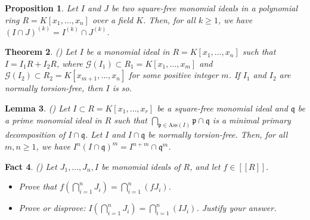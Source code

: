 \documentclass[11pt]{amsart}
\newtheorem{theorem}{Theorem}[section]
\newtheorem{fact}[theorem]{Fact}
\newtheorem{lemma}[theorem]{Lemma}
\newtheorem{proposition}[theorem]{Proposition}
\begin{document}

 \begin{proposition}\label{Intersection}
  Let $I$ and $J$ be two square-free monomial ideals in a polynomial ring $R=K[x_1, \ldots, x_n]$ over a field $K$. Then, for all $k\geq 1$, we have 
  $(I\cap J)^{(k)}=I^{(k)} \cap J^{(k)}$. 
  \end{proposition}
  
  
  \begin{theorem} (\cite[Theorem 2.5]{SN})  \label{NTF.Th.2.5}
Let $I$ be  a  monomial ideal  in  $R=K[x_1, \ldots, x_n]$ such that 
$I=I_1R + I_2R$, where
 $\mathcal{G}(I_1) \subset R_1=K[x_1, \ldots, x_m]$ and $\mathcal{G}(I_2) \subset R_2=K[x_{m+1}, \ldots, x_n]$ for some  positive integer $m$. If $I_1$ and   $I_2$  are normally torsion-free, then  $I$  is so.
 \end{theorem}


\begin{lemma}\label{NCH-1}(\cite[Lemma 2.1]{NCH})
Let $I\subset R=K[x_1, \ldots, x_r]$  be a  square-free monomial ideal  and  $\mathfrak{q}$ be  a prime monomial ideal in $R$ such that $\bigcap_{\mathfrak{p}\in \mathrm{Ass}(I)}\mathfrak{p} \cap \mathfrak{q}$  is  a minimal primary decomposition of  
$I \cap \mathfrak{q}$.   Let  $I$ and $I \cap \mathfrak{q}$ be  normally torsion-free.  
Then, for all $m,n \geq 1$, we have $I^n(I\cap \mathfrak{q})^m=I^{n+m} \cap \mathfrak{q}^m$. 
  \end{lemma}
  

\begin{fact} \label{exercise 7.9.1} (\cite[Exercise 7.9.1]{MRS})
 Let $J_1, \ldots, J_n, I$  be monomial ideals of $R$, and let $f\in [[R]].$ 
\begin{itemize}
\item[(a)]  Prove that $f(\bigcap_{i=1}^nJ_i)=\bigcap_{i=1}^n(fJ_i)$.
\item[(b)] Prove or disprove: $I(\bigcap_{i=1}^nJ_i)=\bigcap_{i=1}^n(IJ_i)$. Justify your answer.
\end{itemize}
\end{fact}
\end{document}
